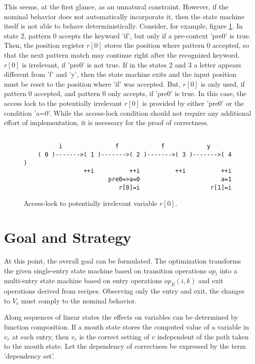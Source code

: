 \documentclass[12pt,a4paper]{scrartcl}
\begin{document}
This seems, at the first glance, as an unnatural constraint. However, if the
nominal behavior does not automatically incorporate it, then the state machine
itself is not able to behave deterministically.  Consider, for example, figure
\ref{fig:access-lock}. In state 2, pattern 0 accepts the keyword 'if', but only
if a pre-context 'pre0' is true. Then, the position register $r[0]$ stores the
position where pattern 0 accepted, so that the next pattern match may continue
right after the recognized keyword. $r[0]$ is irrelevant, if 'pre0' is not
true. If in the states 2 and 3 a letter appears different from 'f' and 'y',
then the state machine exits and the input position must be reset to the
position where 'if' was accepted. But, $r[0]$ is only used, if pattern 0
accepted, and pattern 0 only accepts, if 'pre0' is true.  In this case, the
access lock to the potentially irrelevant $r[0]$ is provided by either 'pre0'
or the condition 'a=0'. While the access-lock condition should not require any
additional effort of implementation, it is necessary for the proof of
correctness.

\begin{figure}[htbp] \leavevmode \label{fig:access-lock}
\begin{verbatim}

          i               f            f            y         
    ( 0 )------->( 1 )------->( 2 )------->( 3 )------->( 4 )
                 ++i          ++i          ++i          ++i 
                        pre0=>a=0                       a=1
                           r[0]=i                    r[1]=i

\end{verbatim}
\caption{Access-lock to potentially irrelevant variable $r[0]$.}
\end{figure}

\section{Goal and Strategy}

At this point, the overall goal can be formulated. The optimization transforms
the given single-entry state machine based on transition operations $op_i$
into a multi-entry state machine based on entry operations $op_E(i,k)$ and exit
operations derived from recipes. Observing only the entry and exit, the changes
to $V_c$ must comply to the nominal behavior. 

Along sequences of linear states the effects on variables can be determined by
function composition. If a mouth state stores the computed value of a variable
in $v_r$ at each entry, then $v_r$ is the correct setting of $v$ independent of
the path taken to the mouth state.  Let the dependency of correctness be
expressed by the term 'dependency set'.
\end{document}
